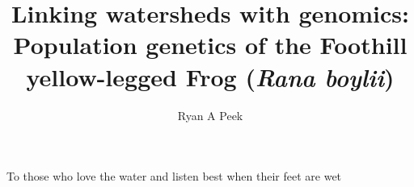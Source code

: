 \documentclass[twoside,12pt,final]{ucthesis-CA2012}
\begin{document}
\begin{ucfrontmatter}


  \title{Linking watersheds with genomics: Population genetics of the Foothill
yellow-legged Frog (\emph{Rana boylii})}

  \author{Ryan A Peek}
   
  \othermemberC{} %

	\maketitle
	\approvalpage

    \begin{dedication}

      \vspace*{25ex}
      \begin{center}
      \begin{Large}

        To those who love the water and listen best when their feet are wet


\end{Large}
\end{center}
\end{dedication}
\end{ucfrontmatter}
\end{document}
